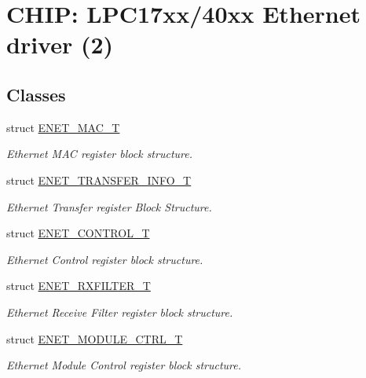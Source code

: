 \hypertarget{group___e_n_e_t__17_x_x__40_x_x}{\section{C\+H\+I\+P\+: L\+P\+C17xx/40xx Ethernet driver (2)}
\label{group___e_n_e_t__17_x_x__40_x_x}
}
\subsection*{Classes}
\begin{DoxyCompactItemize}
\item 
struct \hyperlink{struct_e_n_e_t___m_a_c___t}{E\+N\+E\+T\+\_\+\+M\+A\+C\+\_\+\+T}
\begin{DoxyCompactList}\small\item\em Ethernet M\+A\+C register block structure. \end{DoxyCompactList}\item 
struct \hyperlink{struct_e_n_e_t___t_r_a_n_s_f_e_r___i_n_f_o___t}{E\+N\+E\+T\+\_\+\+T\+R\+A\+N\+S\+F\+E\+R\+\_\+\+I\+N\+F\+O\+\_\+\+T}
\begin{DoxyCompactList}\small\item\em Ethernet Transfer register Block Structure. \end{DoxyCompactList}\item 
struct \hyperlink{struct_e_n_e_t___c_o_n_t_r_o_l___t}{E\+N\+E\+T\+\_\+\+C\+O\+N\+T\+R\+O\+L\+\_\+\+T}
\begin{DoxyCompactList}\small\item\em Ethernet Control register block structure. \end{DoxyCompactList}\item 
struct \hyperlink{struct_e_n_e_t___r_x_f_i_l_t_e_r___t}{E\+N\+E\+T\+\_\+\+R\+X\+F\+I\+L\+T\+E\+R\+\_\+\+T}
\begin{DoxyCompactList}\small\item\em Ethernet Receive Filter register block structure. \end{DoxyCompactList}\item 
struct \hyperlink{struct_e_n_e_t___m_o_d_u_l_e___c_t_r_l___t}{E\+N\+E\+T\+\_\+\+M\+O\+D\+U\+L\+E\+\_\+\+C\+T\+R\+L\+\_\+\+T}
\begin{DoxyCompactList}\small\item\em Ethernet Module Control register block structure. \end{DoxyCompactList}\item 

\end{DoxyCompactItemize}
